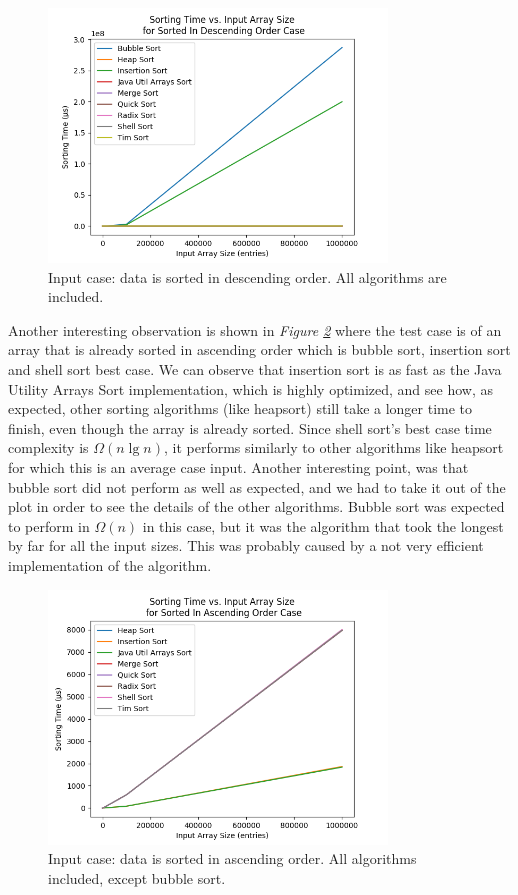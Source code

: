 \begin{figure}[!ht]
\centering
\includegraphics[width=9cm]{figures/plots_all_algs/sorting_time_vs_input_array_size_SortedInDescendingOrderCase.png}
\caption{Input case: data is sorted in descending order. All algorithms are included.}
\label{fig:allInDescendingOrder}
\end{figure}

Another interesting observation is shown in \textit{Figure \ref{fig:allButBubbleInAscendingOrder}} where the test case is of an array that is already sorted in ascending order which is bubble sort, insertion sort and shell sort best case. We can observe that insertion sort is as fast as the Java Utility Arrays Sort implementation, which is highly optimized, and see how, as expected, other sorting algorithms (like heapsort) still take a longer time to finish, even though the array is already sorted. Since shell sort's best case time complexity is $\Omega(n \lg n)$, it performs similarly to other algorithms like heapsort for which this is an average case input. Another interesting point, was that bubble sort did not perform as well as expected, and we had to take it out of the plot in order to see the details of the other algorithms. Bubble sort was expected to perform in $\Omega(n)$ in this case, but it was the algorithm that took the longest by far for all the input sizes. This was probably caused by a not very efficient implementation of the algorithm.

\begin{figure}[!ht]
\centering
\includegraphics[width=9cm]{figures/plots_without_BubbleSort/sorting_time_vs_input_array_size_SortedInAscendingOrderCase.png}
\caption{Input case: data is sorted in ascending order. All algorithms included, except bubble sort.}
\label{fig:allButBubbleInAscendingOrder}
\end{figure}

